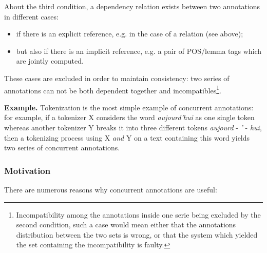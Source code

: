 \documentclass{article}
\newenvironment{xitemize}{
\begin{itemize}
  \setlength{\itemsep}{.3\baselineskip}
  \setlength{\topsep}{0pt}
  \setlength{\parskip}{0pt}
  \setlength{\parsep}{0pt}
}{\end{itemize}}
\begin{document}
About the third condition, a dependency relation exists between two annotations in different cases:
\begin{xitemize}
\item if there is an explicit reference, e.g. in the case of a relation (see above);
\item but also if there is an implicit reference, e.g. a pair of POS/lemma tags which are jointly computed.
\end{xitemize}

These cases are excluded in order to maintain consistency: two series of annotations can not be both dependent together and incompatibles\footnote{Incompatibility among the annotations inside one serie being excluded by the second condition, such a case would mean either that the annotations distribution between the two sets is wrong, or that the system which yielded the set containing the incompatibility is faulty.}.

{\bf Example.}
Tokenization is the most simple example of concurrent annotations: for example, if a tokenizer X considers the word {\em aujourd'hui} as one single token whereas another tokenizer Y breaks it into three different tokens  {\em aujourd} - {\em '} - {\em hui}, then a tokenizing process using X {\em and} Y on a text containing this word yields two series of concurrent annotations.


\subsubsection{Motivation}
\label{partMotivations}

There are numerous reasons why concurrent annotations are useful:
\end{document}

